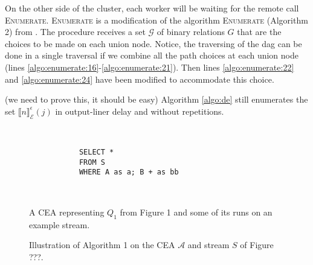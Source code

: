 On the other side of the cluster, each worker will be waiting for the remote call \textsc{Enumerate}. \textsc{Enumerate} is a modification of the algorithm \textsc{Enumerate} (Algorithm 2) from \cite{core}. The procedure receives a set $\mathcal{G}$ of binary relations $G$ that are the choices to be made on each union node. Notice, the traversing of the \gls{dag} can be done in a single traversal if we combine all the path choices at each union node (lines \ref{algo:enumerate:16}-\ref{algo:enumerate:21}). Then lines \ref{algo:enumerate:22} and \ref{algo:enumerate:24} have been modified to accommodate this choice.

(we need to prove this, it should be easy) Algorithm \ref{algo:de} still enumerates the set ${\llbracket n \rrbracket}^{\epsilon}_{\mathcal{E}}(j)$ in output-liner delay and without repetitions.

\begin{figure}[H]
  \centering
  \begin{subfigure}[t]{\textwidth}
    \centering
  \end{subfigure}
  \\
  \begin{subfigure}[b]{\textwidth}
    \begin{verbatim}
      SELECT *
      FROM S
      WHERE A as a; B + as bb
    \end{verbatim}
  \end{subfigure}
  \\
  \begin{subfigure}[b]{\textwidth}
    \centering
  \end{subfigure}
  \caption{A CEA representing $Q_{1}$ from Figure 1 and some of its runs on an example stream.}
  \label{fig:label}
\end{figure}

\begin{figure}[H]
  \centering
  \begin{subfigure}[t]{0.1\linewidth}
  \end{subfigure}
  \begin{subfigure}[t]{0.1\linewidth}
  \end{subfigure}
  \begin{subfigure}[t]{0.24\linewidth}
  \end{subfigure}
  \begin{subfigure}[t]{0.24\linewidth}
  \end{subfigure}
  \begin{subfigure}[t]{0.28\linewidth}
  \end{subfigure}
  \caption{Illustration of Algorithm 1 on the CEA $\mathcal{A}$ and stream $S$ of Figure ???.}
  \label{fig:label}
\end{figure}

